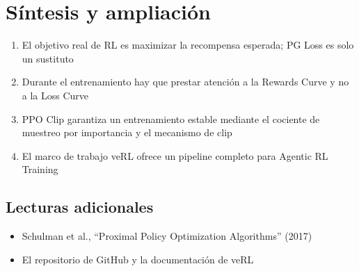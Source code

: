 \section{Síntesis y ampliación}
\begin{enumerate}
  \item El objetivo real de RL es maximizar la recompensa esperada; PG Loss es solo un sustituto
  \item Durante el entrenamiento hay que prestar atención a la Rewards Curve y no a la Loss Curve
  \item PPO Clip garantiza un entrenamiento estable mediante el cociente de muestreo por importancia y el mecanismo de clip
  \item El marco de trabajo veRL ofrece un pipeline completo para Agentic RL Training
\end{enumerate}

\subsection{Lecturas adicionales}
\begin{itemize}
  \item Schulman et al., ``Proximal Policy Optimization Algorithms'' (2017)
  \item El repositorio de GitHub y la documentación de veRL
\end{itemize}

